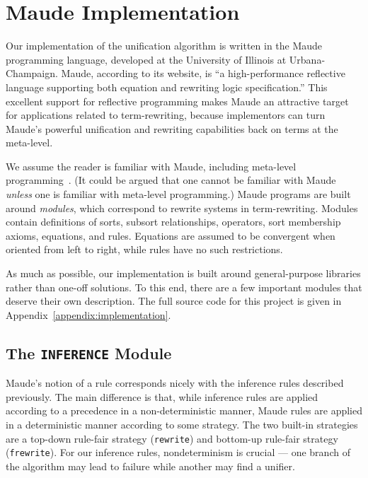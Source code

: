 \documentclass[11pt,twoside,titlepage]{article}
\newcommand{\TitleListing}[1]{\texorpdfstring{\lstinline|#1|}{#1}}
\begin{document}
\section{Maude Implementation}\label{section:maude}

Our implementation of the unification algorithm is written in the Maude
programming language, developed at the University of Illinois at
Urbana-Champaign. Maude, according to its website, is ``a high-performance
reflective language supporting both equation and rewriting logic
specification.'' This excellent support for reflective programming makes Maude
an attractive target for applications related to term-rewriting, because
implementors can turn Maude's powerful unification and rewriting capabilities
back on terms at the meta-level.

We assume the reader is familiar with Maude, including meta-level
programming~\cite{clavel2011maude}. (It could be argued that one cannot be
familiar with Maude \emph{unless} one is familiar with meta-level programming.)
Maude programs are built around \emph{modules}, which correspond to rewrite
systems in term-rewriting. Modules contain definitions of sorts, subsort
relationships, operators, sort membership axioms, equations, and rules.
Equations are assumed to be convergent when oriented from left to right, while
rules have no such restrictions.

As much as possible, our implementation is built around general-purpose
libraries rather than one-off solutions. To this end, there are a few important
modules that deserve their own description. The full source code for this
project is given in Appendix~\ref{appendix:implementation}.

\subsection{The \TitleListing{INFERENCE} Module}\label{subsection:inference-mod}

Maude's notion of a rule corresponds nicely with the inference rules described
previously. The main difference is that, while inference rules are applied
according to a precedence in a non-deterministic manner, Maude rules are applied
in a deterministic manner according to some strategy. The two built-in strategies
are a top-down rule-fair strategy (\lstinline|rewrite|) and bottom-up rule-fair
strategy (\lstinline|frewrite|). For our inference rules, nondeterminism is
crucial --- one branch of the algorithm may lead to failure while another may
find a unifier.
\end{document}
